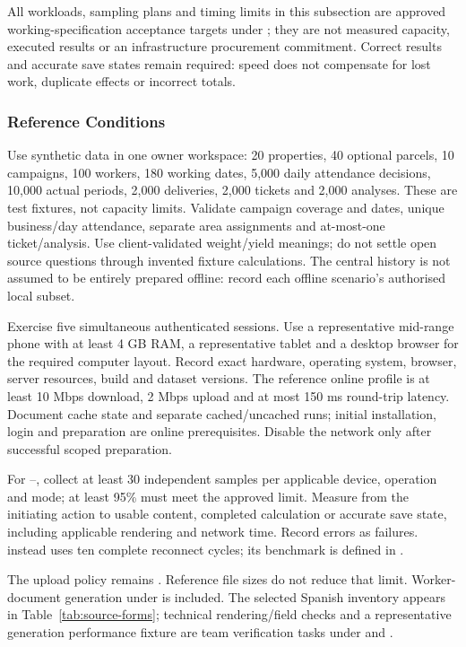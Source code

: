 All workloads, sampling plans and timing limits in this subsection are approved
working-specification acceptance targets under ; they are not
measured capacity, executed results or an infrastructure procurement commitment. Correct results and accurate save states remain required:
speed does not compensate for lost work, duplicate effects or incorrect totals.

\subsubsection{Reference Conditions}\label{sec:nfr-performance-reference}
Use synthetic data in one owner workspace: 20 properties, 40 optional parcels,
10 campaigns, 100 workers, 180 working dates, 5,000 daily attendance decisions,
10,000 actual periods, 2,000 deliveries, 2,000 tickets and 2,000 analyses. These are
test fixtures, not capacity limits. Validate campaign coverage and dates, unique
business/day attendance, separate area assignments and at-most-one ticket/analysis.
Use client-validated weight/yield meanings; do not settle open source questions
through invented fixture calculations. The central history is not assumed to be
entirely prepared offline: record each offline scenario's authorised local subset.

Exercise five simultaneous authenticated sessions. Use a representative mid-range
phone with at least 4 GB RAM, a representative tablet and a desktop browser for the required computer layout. Record exact hardware, operating system, browser, server resources, build
and dataset versions. The reference online profile is at least 10 Mbps download,
2 Mbps upload and at most 150 ms round-trip latency. Document cache state and
separate cached/uncached runs; initial installation, login and preparation are online
prerequisites. Disable the network only after successful scoped preparation.

For --, collect at least 30 independent samples
per applicable device, operation and mode; at least 95\% must meet the approved
limit. Measure from the initiating action to usable content, completed calculation
or accurate save state, including applicable rendering and network time. Record
errors as failures.  instead uses ten complete reconnect cycles;
its benchmark is defined in .

The upload policy remains \hyperref[br:044]{}. Reference
file sizes do not reduce that limit. Worker-document generation under
\hyperref[fr:063]{} is included. The selected Spanish inventory appears in Table~\ref{tab:source-forms}; technical rendering/field checks and a representative generation performance fixture are team verification tasks under  and
.

